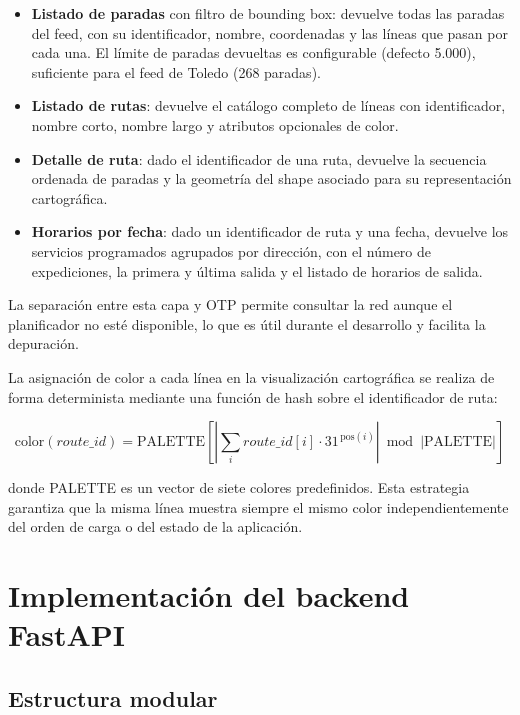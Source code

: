 \begin{itemize}
  \item \textbf{Listado de paradas} con filtro de bounding box: devuelve todas las paradas del feed, con su identificador, nombre, coordenadas y las líneas que pasan por cada una. El límite de paradas devueltas es configurable (defecto 5.000), suficiente para el feed de Toledo (268 paradas).
  \item \textbf{Listado de rutas}: devuelve el catálogo completo de líneas con identificador, nombre corto, nombre largo y atributos opcionales de color.
  \item \textbf{Detalle de ruta}: dado el identificador de una ruta, devuelve la secuencia ordenada de paradas y la geometría del shape asociado para su representación cartográfica.
  \item \textbf{Horarios por fecha}: dado un identificador de ruta y una fecha, devuelve los servicios programados agrupados por dirección, con el número de expediciones, la primera y última salida y el listado de horarios de salida.
\end{itemize}

La separación entre esta capa y OTP permite consultar la red aunque el planificador no esté disponible, lo que es útil durante el desarrollo y facilita la depuración.

La asignación de color a cada línea en la visualización cartográfica se realiza de forma determinista mediante una función de hash sobre el identificador de ruta:

\begin{equation}
  \text{color}(\mathit{route\_id}) = \text{PALETTE}\left[\left|\sum_{i} \mathit{route\_id}[i] \cdot 31^{\,\text{pos}(i)}\right| \bmod |\text{PALETTE}|\right]
\end{equation}

donde PALETTE es un vector de siete colores predefinidos. Esta estrategia garantiza que la misma línea muestra siempre el mismo color independientemente del orden de carga o del estado de la aplicación.

\section{Implementación del backend FastAPI}
\label{sec:impl_backend}

\subsection{Estructura modular}

